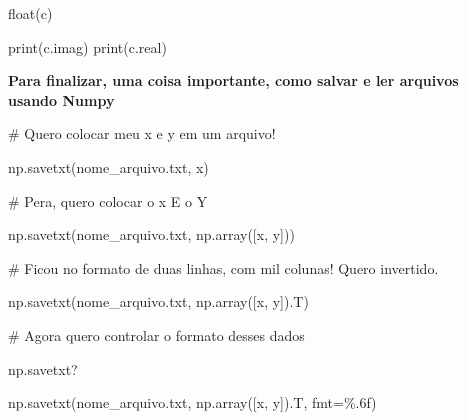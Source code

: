 \documentclass[
  letterpaper,
  DIV=11,
  numbers=noendperiod]{scrreprt}
\newenvironment{Shaded}{\begin{snugshade}}{\end{snugshade}}
\newcommand{\NormalTok}[1]{\textcolor[rgb]{0.00,0.23,0.31}{#1}}
\begin{document}
\begin{Shaded}
\begin{Highlighting}[]
\NormalTok{float(c)}
\end{Highlighting}
\end{Shaded}

\begin{Shaded}
\begin{Highlighting}[]
\NormalTok{print(c.imag)}
\NormalTok{print(c.real)}
\end{Highlighting}
\end{Shaded}

\textbf{Para finalizar, uma coisa importante, como salvar e ler arquivos
usando Numpy}

\begin{Shaded}
\begin{Highlighting}[]
\NormalTok{\# Quero colocar meu x e y em um arquivo!}

\NormalTok{np.savetxt(\textquotesingle{}nome\_arquivo.txt\textquotesingle{}, x)}
\end{Highlighting}
\end{Shaded}

\begin{Shaded}
\begin{Highlighting}[]
\NormalTok{\# Pera, quero colocar o x E o Y}

\NormalTok{np.savetxt(\textquotesingle{}nome\_arquivo.txt\textquotesingle{}, np.array([x, y]))}
\end{Highlighting}
\end{Shaded}

\begin{Shaded}
\begin{Highlighting}[]
\NormalTok{\# Ficou no formato de duas linhas, com mil colunas! Quero invertido.}

\NormalTok{np.savetxt(\textquotesingle{}nome\_arquivo.txt\textquotesingle{}, np.array([x, y]).T)}
\end{Highlighting}
\end{Shaded}

\begin{Shaded}
\begin{Highlighting}[]
\NormalTok{\# Agora quero controlar o formato desses dados}

\NormalTok{np.savetxt?}
\end{Highlighting}
\end{Shaded}

\begin{Shaded}
\begin{Highlighting}[]
\NormalTok{np.savetxt(\textquotesingle{}nome\_arquivo.txt\textquotesingle{}, }
\NormalTok{           np.array([x, y]).T,}
\NormalTok{           fmt=\textquotesingle{}\%.6f\textquotesingle{})}
\end{Highlighting}
\end{Shaded}
\end{document}
